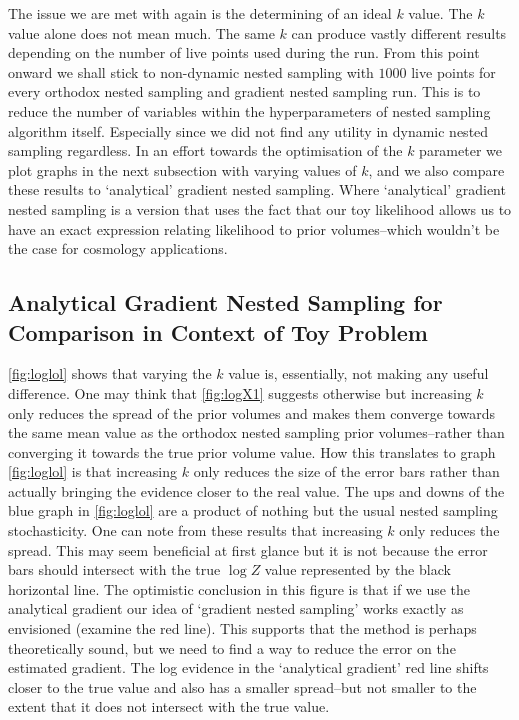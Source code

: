 The issue we are met with again is the determining of an ideal $k$ value. The $k$ value alone does not mean much. The same $k$ can produce vastly different results depending on the number of live points used during the run. From this point onward  we shall stick to non-dynamic nested sampling with $1000$ live points for every orthodox nested sampling and gradient nested sampling run. This is to reduce the number of variables within the hyperparameters of nested sampling algorithm itself. Especially since we did not find any utility in dynamic nested sampling regardless. In an effort towards the optimisation of the $k$ parameter we plot graphs in the next subsection with varying values of $k$, and we also compare these results to `analytical' gradient nested sampling. Where `analytical' gradient nested sampling is a version that uses the fact that our toy likelihood allows us to have an exact expression relating likelihood to prior volumes--which wouldn't be the case for cosmology applications. 


\subsection{Analytical Gradient Nested Sampling for Comparison in Context of Toy Problem}




\cref{fig:loglol} shows that varying the $k$ value is, essentially, not making any useful difference. One may think that \cref{fig:logX1} suggests otherwise but increasing $k$ only reduces the spread of the prior volumes and makes them converge towards the same mean value as the orthodox nested sampling prior volumes--rather than converging it towards the true prior volume value. How this translates to graph \cref{fig:loglol} is that increasing $k$ only reduces the size of the error bars rather than actually bringing the evidence closer to the real value. The ups and downs of the blue graph in \cref{fig:loglol} are a product of nothing but the usual nested sampling stochasticity. One can note from these results that increasing $k$ only reduces the spread. This may seem beneficial at first glance but it is not because the error bars should intersect with the true $\log Z$ value represented by the black horizontal line. The optimistic conclusion in this figure is that if we use the analytical gradient our idea of `gradient nested sampling' works exactly as envisioned (examine the red line). This supports that the method is perhaps theoretically sound, but we need to find a way to reduce the error on the estimated gradient. The log evidence in the `analytical gradient' red line shifts closer to the true value and also has a smaller spread--but not smaller to the extent that it does not intersect with the true value.


